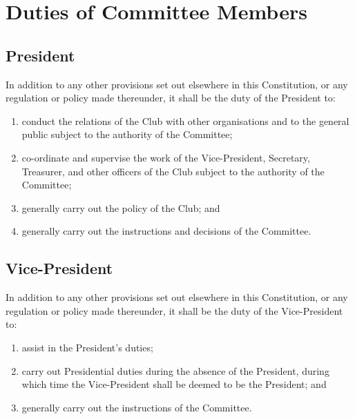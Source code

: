 \documentclass[11pt]{article} %
\begin{document}
\section{Duties of Committee Members}
\subsection{President}
In addition to any other provisions set out elsewhere in this Constitution, or any regulation or policy made thereunder, it shall be the duty of the President to:
\begin{enumerate}
	\item conduct the relations of the Club with other organisations and to the general public subject to the authority of the Committee;
	\item co-ordinate and supervise the work of the Vice-President, Secretary, Treasurer, and other officers of the Club subject to the authority of the Committee;
	\item generally carry out the policy of the Club; and
	\item generally carry out the instructions and decisions of the Committee.
\end{enumerate}

\subsection{Vice-President}
In addition to any other provisions set out elsewhere in this Constitution, or any regulation or policy made thereunder, it shall be the duty of the Vice-President to:
\begin{enumerate}
	\item assist in the President's duties;
	\item carry out Presidential duties during the absence of the President, during which time the Vice-President shall be deemed to be the President; and
	\item generally carry out the instructions of the Committee.
\end{enumerate}
\end{document}
